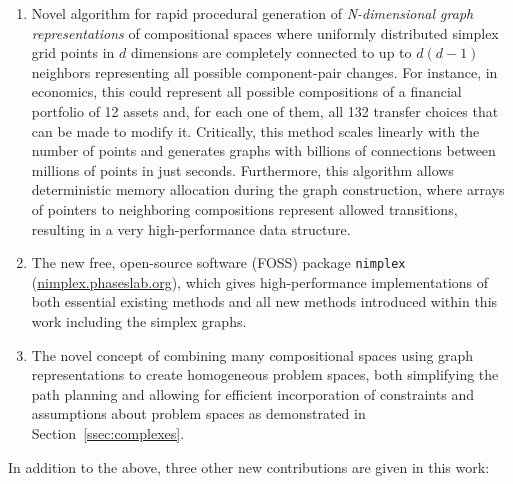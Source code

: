\begin{enumerate}
    \item Novel algorithm for rapid procedural generation of \emph{N-dimensional graph representations} of compositional spaces where uniformly distributed simplex grid points in $d$ dimensions are completely connected to up to $d(d-1)$ neighbors representing all possible component-pair changes. For instance, in economics, this could represent all possible compositions of a financial portfolio of 12 assets and, for each one of them, all 132 transfer choices that can be made to modify it. Critically, this method scales linearly with the number of points and generates graphs with billions of connections between millions of points in just seconds. Furthermore, this algorithm allows deterministic memory allocation during the graph construction, where arrays of pointers to neighboring compositions represent allowed transitions, resulting in a very high-performance data structure.
    
    \item The new free, open-source software (FOSS) package \texttt{nimplex} (\href{https://nimplex.phaseslab.org}{nimplex.phaseslab.org}), which gives high-performance implementations of both essential existing methods and all new methods introduced within this work including the simplex graphs.
    
    \item The novel concept of combining many compositional spaces using graph representations to create homogeneous problem spaces, both simplifying the path planning and allowing for efficient incorporation of constraints and assumptions about problem spaces as demonstrated in Section~\ref{ssec:complexes}. 
    
\end{enumerate}

In addition to the above, three other new contributions are given in this work:

